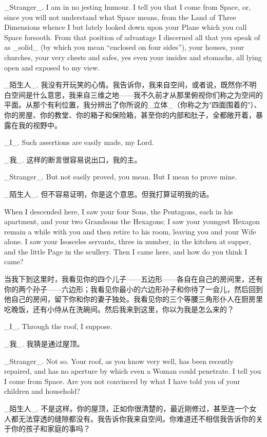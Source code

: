 \documentclass[12pt,UTF8]{ctexbook}
\begin{document}
\_Stranger\_. I am in no jesting humour. I tell you that I come from Space, or, since you will not understand what Space means, from the Land of Three Dimensions whence I but lately looked down upon your Plane which you call Space forsooth. From that position of advantage I discerned all that you speak of as \_solid\_ (by which you mean ``enclosed on four sides''), your houses, your churches, your very chests and safes, yes even your insides and stomachs, all lying open and exposed to my view.

\_陌生人\_. 我没有开玩笑的心情。我告诉你，我来自空间，或者说，既然你不明白空间是什么意思，我来自三维之地——我不久前才从那里俯视你们称之为空间的平面。从那个有利位置，我分辨出了你所说的\_立体\_（你称之为"四面围着的"）、你的房屋、你的教堂、你的箱子和保险箱，甚至你的内部和肚子，全都敞开着，暴露在我的视野中。

\_I\_. Such assertions are easily made, my Lord.

\_我\_. 这样的断言很容易说出口，我的主。

\_Stranger\_. But not easily proved, you mean. But I mean to prove mine.

\_陌生人\_. 但不容易证明，你是这个意思。但我打算证明我的话。

When I descended here, I saw your four Sons, the Pentagons, each in his apartment, and your two Grandsons the Hexagons; I saw your youngest Hexagon remain a while with you and then retire to his room, leaving you and your Wife alone. I saw your Isosceles servants, three in number, in the kitchen at supper, and the little Page in the scullery. Then I came here, and how do you think I came?

当我下到这里时，我看见你的四个儿子——五边形——各自在自己的房间里，还有你的两个孙子——六边形；我看见你最小的六边形孙子和你待了一会儿，然后回到他自己的房间，留下你和你的妻子独处。我看见你的三个等腰三角形仆人在厨房里吃晚饭，还有小侍从在洗碗间。然后我来到这里，你以为我是怎么来的？

\_I\_. Through the roof, I suppose.

\_我\_. 我猜是通过屋顶。

\_Stranger\_. Not so. Your roof, as you know very well, has been recently repaired, and has no aperture by which even a Woman could penetrate. I tell you I come from Space. Are you not convinced by what I have told you of your children and household?

\_陌生人\_. 不是这样。你的屋顶，正如你很清楚的，最近刚修过，甚至连一个女人都无法穿透的缝隙都没有。我告诉你我来自空间。你难道还不相信我告诉你的关于你的孩子和家庭的事吗？
\end{document}
